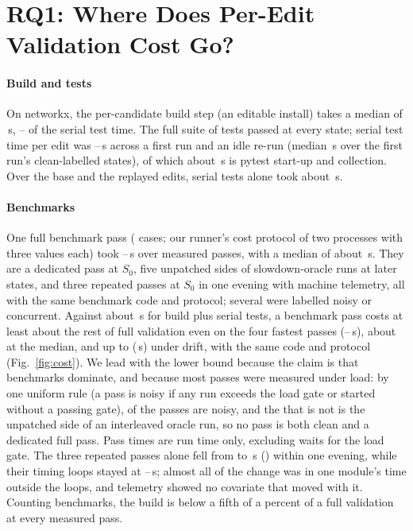 \section{RQ1: Where Does Per-Edit Validation Cost Go?}
\label{sec:rq1}

\paragraph*{Build and tests}
On networkx, the per-candidate build step (an editable install) takes a median of \NxBuildMedian\,s, \NxBuildShareTestsLo--\NxBuildShareTestsHi\pct{} of the serial test time.
The full suite of \NxNumTests{} tests passed at every state; serial test time per edit was \NxTestsLo--\NxTestsHi\,s across a first run and an idle re-run (median \NxTestsMedianClean\,s over the first run's clean-labelled states), of which about \NxPytestStartup\,s is pytest start-up and collection.
Over the base and the \NxReplayed{} replayed edits, serial tests alone took about \NxTestsSession\,s.

\paragraph*{Benchmarks}
One full benchmark pass (\NxBenchCases{} cases; our runner's cost protocol of two processes with three values each) took \NxBenchPassMin--\NxBenchPassMax\,s over \NxBenchPasses{} measured passes, with a median of about \NxBenchPassMedian\,s.
They are a dedicated pass at $S_0$, five unpatched sides of slowdown-oracle runs at later states, and three repeated passes at $S_0$ in one evening with machine telemetry, all with the same benchmark code and protocol; several were labelled noisy or concurrent.
Against about \NxBuildTests\,s for build plus serial tests, a benchmark pass costs at least about \NxBenchRatioTypical\x{} the rest of full validation even on the four fastest passes (\NxBenchPassMin--\NxBenchPassTypicalHi\,s), about \NxBenchRatioMedian\x{} at the median, and up to \NxBenchRatioHi\x{} (\NxBenchPassMax\,s) under drift, with the same code and protocol (Fig.~\ref{fig:cost}).
We lead with the lower bound because the claim is that benchmarks dominate, and because most passes were measured under load: by one uniform rule (a pass is noisy if any run exceeds the load gate or started without a passing gate), \PassesNoisy{} of the \NxBenchPasses{} passes are noisy, and the \PassesMeasured{} that is not is the unpatched side of an interleaved oracle run, so no pass is both clean and a dedicated full pass.
Pass times are run time only, excluding waits for the load gate.
The three repeated passes alone fell from \DriftEveningHi{} to \DriftEveningLo\,s (\DriftEveningRatio\x) within one evening, while their timing loops stayed at \DriftLoopsLo--\DriftLoopsHi\,s; almost all of the change was in one module's time outside the loops, and telemetry showed no covariate that moved with it.
Counting benchmarks, the build is below a fifth of a percent of a full validation at every measured pass.

